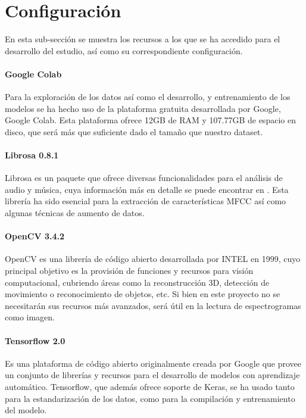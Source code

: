 \documentclass[11pt,a4paper,spanish]{book}
\begin{document}
	\section{Configuración}
	En esta sub-sección se muestra los recursos a los que se ha accedido para el desarrollo del estudio, así como su correspondiente configuración.

	
	
	\paragraph{Google Colab} Para la exploración de los datos así como el desarrollo, y entrenamiento de los modelos se ha hecho uso de la plataforma gratuita desarrollada por Google, Google Colab. Esta plataforma ofrece 12GB de RAM  y 107.77GB de espacio en disco, que será más que suficiente dado el tamaño que nuestro dataset.
	
	\paragraph{Librosa 0.8.1} Librosa es un paquete que ofrece diversas funcionalidades para el análisis de audio y música, cuya información más en detalle se puede encontrar en \cite{librosa082}. Esta librería ha sido esencial para la extracción de características MFCC así como algunas técnicas de aumento de datos.
	
	\paragraph{OpenCV 3.4.2} OpenCV es una librería de código abierto desarrollada por INTEL en 1999, cuyo principal objetivo es la provisión de funciones y recursos para visión computacional, cubriendo áreas como la reconstrucción 3D, detección de movimiento o reconocimiento de objetos, etc. Si bien en este proyecto no se necesitarán sus recursos más avanzados, será útil en la lectura de espectrogramas como imagen. 
	
	\paragraph{Tensorflow 2.0} Es una plataforma de código abierto originalmente creada por Google que provee un conjunto de librerías y recursos para el desarrollo de modelos con aprendizaje automático. Tensorflow, que además ofrece soporte de Keras, se ha usado tanto para la estandarización de los datos, como para la compilación y entrenamiento del modelo.
	
\end{document}
